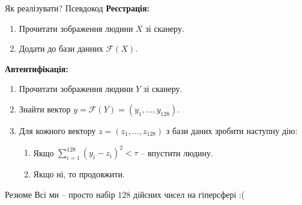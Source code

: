 \documentclass{zkdl-presentation-template}
\begin{document}
    \begin{frame}{Як реалізувати? Псевдокод}
        \textbf{Реєстрація:}

        \begin{enumerate}
            \item Прочитати зображення людини $X$ зі сканеру.
            \item Додати до бази данних $\mathcal{F}(X)$.
        \end{enumerate}

        \textbf{Автентифікація:}
        \begin{enumerate}
            \item Прочитати зображення людини $Y$ зі сканеру.
            \item Знайти вектор $y = \mathcal{F}(Y) = (y_1,\dots,y_{128})$.
            \item Для кожного вектору $z=(z_1,\dots,z_{128})$ з бази даних зробити наступну дію:
            \begin{enumerate}
                \item Якщо $\sum_{i=1}^{128}(y_i-z_i)^2 < \tau$ -- впустити людину.
                \item Якщо ні, то продовжити.
            \end{enumerate}
        \end{enumerate}

        \begin{block}{Резюме}
            Всі ми -- просто набір $128$ дійсних чисел на гіперсфері :(
        \end{block}
    \end{frame}
\end{document}
